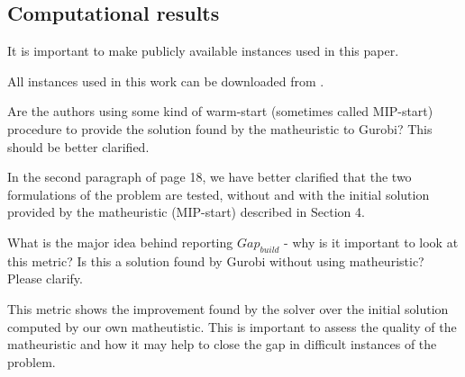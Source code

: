 \documentclass{article}
\newenvironment{reviewer}{\setcounter{pointcounter}{1}}{}
\newcommand{\point}{\text{{\selectfont \thepointcounter} \stepcounter{pointcounter}}}
\newcommand{\JP}[1]{{\color{black}#1}}
\begin{document}
\begin{reviewer}
		
		\subsection*{Computational results}
		
		\begin{itshape}
			It is important to make publicly available instances used in this paper.
		\end{itshape}
		
		\begin{tcolorbox}[breakable,enhanced,coltitle=black,colback=green!5!white,colframe=green!75!black,title=\textbf{Answer R2.\point},borderline={1pt}{0pt}{black},boxrule=0pt]
			All instances used in this work can be downloaded from \cite{valverde2023}.
		\end{tcolorbox}
		
		\begin{itshape}
			Are the authors using some kind of warm-start (sometimes called MIP-start) procedure to provide the solution found by the matheuristic to Gurobi? This should be better clarified.
		\end{itshape}
		
		\begin{tcolorbox}[breakable,enhanced,coltitle=black,colback=green!5!white,colframe=green!75!black,title=\textbf{Answer R2.\point},borderline={1pt}{0pt}{black},boxrule=0pt]
			In the second paragraph of page 18, we have better clarified that the two formulations of the problem are tested, without and with the initial solution provided by the matheuristic (MIP-start) described in Section 4.
 		\end{tcolorbox}
		
		\begin{itshape}
			What is the major idea behind reporting $Gap_{build}$ - why is it important to look at this metric? Is this a solution found by Gurobi without using matheuristic? Please clarify.
		\end{itshape}

		\begin{tcolorbox}[breakable,enhanced,coltitle=black,colback=green!5!white,colframe=green!75!black,title=\textbf{Answer R2.\point},borderline={1pt}{0pt}{black},boxrule=0pt]
			\JP{This metric shows the improvement found by the solver over the initial solution computed by our own matheutistic. This is important to assess the quality of the matheuristic and how it may help to close the gap in difficult instances of the problem.}
		\end{tcolorbox}


\end{reviewer}
\end{document}

